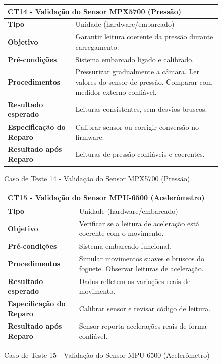 \begin{figure}[H]
    \centering
\begin{longtable}{|p{}|p{}|}
\hline
\multicolumn{2}{|l|}{\textbf{CT14 - Validação do Sensor MPX5700 (Pressão)}} \\
\hline
\textbf{Tipo} & Unidade (hardware/embarcado) \\
\hline
\textbf{Objetivo} & Garantir leitura coerente da pressão durante carregamento. \\
\hline
\textbf{Pré-condições} & Sistema embarcado ligado e calibrado. \\
\hline
\textbf{Procedimentos} &  Pressurizar gradualmente a câmara.  Ler valores do sensor de pressão.  Comparar com medidor externo confiável.  \\
\hline
\textbf{Resultado esperado} & Leituras consistentes, sem desvios bruscos. \\
\hline
\textbf{Especificação do Reparo} & Calibrar sensor ou corrigir conversão no firmware. \\
\hline
\textbf{Resultado após Reparo} & Leituras de pressão confiáveis e coerentes. \\
\hline
\end{longtable}
\caption{Caso de Teste 14 - Validação do Sensor MPX5700 (Pressão)}
\label{fig_ct14_validacao_sensor_mpx5700}
\end{figure}

\begin{figure}[H]
    \centering
\begin{longtable}{|p{}|p{}|}
\hline
\multicolumn{2}{|l|}{\textbf{CT15 - Validação do Sensor MPU-6500 (Acelerômetro)}} \\
\hline
\textbf{Tipo} & Unidade (hardware/embarcado) \\
\hline
\textbf{Objetivo} & Verificar se a leitura de aceleração está coerente com o movimento. \\
\hline
\textbf{Pré-condições} & Sistema embarcado funcional. \\
\hline
\textbf{Procedimentos} &  Simular movimentos suaves e bruscos do foguete.  Observar leituras de aceleração.  \\
\hline
\textbf{Resultado esperado} & Dados refletem as variações reais de movimento. \\
\hline
\textbf{Especificação do Reparo} & Calibrar sensor e revisar código de leitura. \\
\hline
\textbf{Resultado após Reparo} & Sensor reporta acelerações reais de forma confiável. \\
\hline
\end{longtable}
\caption{Caso de Teste 15 - Validação do Sensor MPU-6500 (Acelerômetro)}
\label{fig_ct15_validacao_sensor_mpu6500}
\end{figure}

